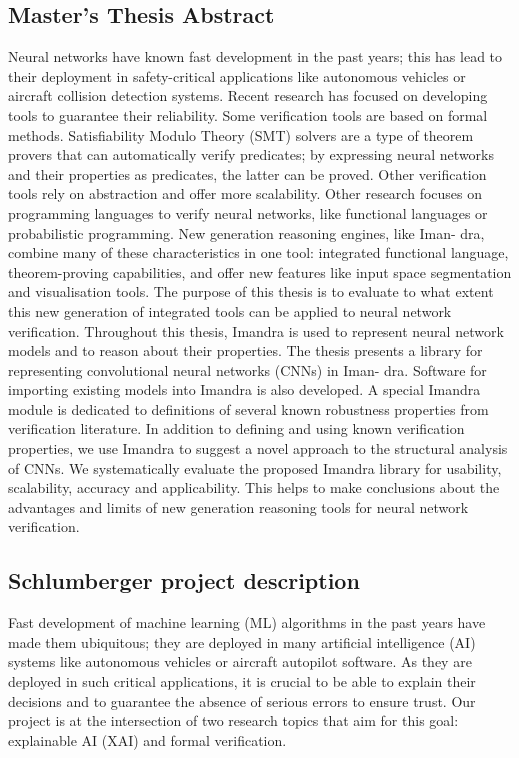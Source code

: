 \documentclass[]{article}
\begin{document}
\subsection*{Master's Thesis Abstract}
Neural networks have known fast development in the past years; this has lead to their
deployment in safety-critical applications like autonomous vehicles or aircraft collision
detection systems. Recent research has focused on developing tools to guarantee their
reliability.
Some verification tools are based on formal methods. Satisfiability Modulo Theory
(SMT) solvers are a type of theorem provers that can automatically verify predicates;
by expressing neural networks and their properties as predicates, the latter can be
proved. Other verification tools rely on abstraction and offer more scalability. Other
research focuses on programming languages to verify neural networks, like functional
languages or probabilistic programming. New generation reasoning engines, like Iman-
dra, combine many of these characteristics in one tool: integrated functional language,
theorem-proving capabilities, and offer new features like input space segmentation and
visualisation tools.
The purpose of this thesis is to evaluate to what extent this new generation of integrated
tools can be applied to neural network verification. Throughout this thesis, Imandra
is used to represent neural network models and to reason about their properties. The
thesis presents a library for representing convolutional neural networks (CNNs) in Iman-
dra. Software for importing existing models into Imandra is also developed. A special
Imandra module is dedicated to definitions of several known robustness properties from
verification literature. In addition to defining and using known verification properties,
we use Imandra to suggest a novel approach to the structural analysis of CNNs. We
systematically evaluate the proposed Imandra library for usability, scalability, accuracy
and applicability. This helps to make conclusions about the advantages and limits of
new generation reasoning tools for neural network verification.


\subsection*{Schlumberger project description}

Fast development of machine learning (ML) algorithms in the past years have made them ubiquitous; they are deployed in many artificial intelligence (AI) systems like autonomous vehicles or aircraft autopilot software. As they are deployed in such critical applications, it is crucial to be able to explain their decisions and to guarantee the absence of serious errors to ensure trust. Our project is at the intersection of two research topics that aim for this goal: explainable AI (XAI) and formal verification.
\end{document}
